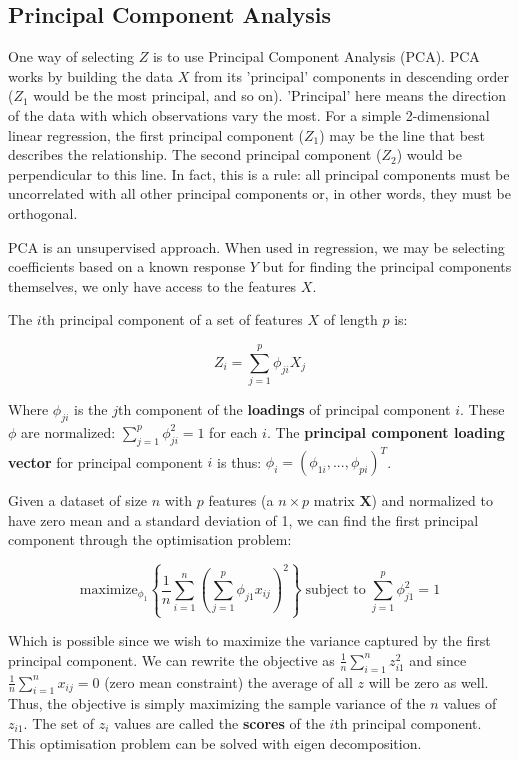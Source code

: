 \subsection{Principal Component Analysis}

One way of selecting $Z$ is to use Principal Component Analysis (PCA). PCA works by building the data $X$ from its 'principal' components in descending order ($Z_{1}$ would be the most principal, and so on). 'Principal' here means the direction of the data with which observations vary the most. For a simple 2-dimensional linear regression, the first principal component ($Z_{1}$) may be the line that best describes the relationship. The second principal component ($Z_{2}$) would be perpendicular to this line. In fact, this is a rule: all principal components must be uncorrelated with all other principal components or, in other words, they must be orthogonal.

PCA is an unsupervised approach. When used in regression, we may be selecting coefficients based on a known response $Y$ but for finding the principal components themselves, we only have access to the features $X$. 

The $i$th principal component of a set of features $X$ of length $p$ is:

$$ Z_{i} = \sum_{j=1}^{p}\phi_{ji}X_{j} $$

Where $\phi_{ji}$ is the $j$th component of the \textbf{loadings} of principal component $i$. These $\phi$ are normalized: $\sum_{j=1}^{p}\phi_{ji}^{2}=1$ for each $i$. The \textbf{principal component loading vector} for principal component $i$ is thus: $\phi_{i}=(\phi_{1i},...,\phi_{pi})^{T}$.

Given a dataset of size $n$ with $p$ features (a $n\times p$ matrix $\mathbf{X}$) and normalized to have zero mean and a standard deviation of 1, we can find the first principal component through the optimisation problem:

$$ \text{maximize}_{\phi_{1}} \left\{ \frac{1}{n} \sum_{i=1}^{n} \left( \sum_{j=1}^{p} \phi_{j1}x_{ij} \right)^{2} \right\}\; \text{subject to}\; \sum_{j=1}^{p}\phi_{j1}^{2}=1 $$

Which is possible since we wish to maximize the variance captured by the first principal component. We can rewrite the objective as $\frac{1}{n}\sum_{i=1}^{n}z_{i1}^{2}$ and since $\frac{1}{n}\sum_{i=1}^{n}x_{ij}=0$ (zero mean constraint) the average of all $z$ will be zero as well. Thus, the objective is simply maximizing the sample variance of the $n$ values of $z_{i1}$. The set of $z_{i}$ values are called the \textbf{scores} of the $i$th principal component. This optimisation problem can be solved with eigen decomposition.

